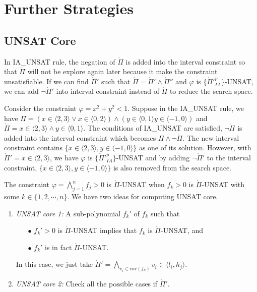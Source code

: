 \chapter{Further Strategies}
\section{UNSAT Core}
In \tiny IA\_UNSAT \normalsize rule, the negation of $\mathring\Pi$ is added into the interval constraint so that $\mathring\Pi$ will not be explore again later because it make the constraint unsatisfiable. If we can find $\mathring\Pi'$ such that $\mathring\Pi = \mathring\Pi' \wedge \mathring\Pi''$ and $\varphi$ is $\{\mathring\Pi'^p_{IA}\}$-UNSAT, we can add $\neg\mathring\Pi'$ into interval constraint instead of $\mathring\Pi$ to reduce the search space.

\begin{example}
Consider the constraint $\varphi = x^2 + y^2 < 1$. Suppose in the \tiny IA\_UNSAT \normalsize rule, we have $\Pi = (x \in \langle 2, 3 \rangle \vee x \in \langle 0, 2 \rangle) \wedge (y \in \langle 0, 1 \rangle y \in \langle -1, 0 \rangle)$ and $\mathring\Pi = x \in \langle 2, 3 \rangle \wedge y \in \langle 0, 1 \rangle$. The conditions of \tiny IA\_UNSAT \normalsize are satisfied, $\neg \mathring\Pi$ is added into the interval constraint which becomes $\Pi \wedge \neg \mathring\Pi$. The new interval constraint contains $\{x \in \langle 2, 3 \rangle, y \in \langle -1, 0 \rangle\}$ as one of its solution. However, with $\mathring\Pi' = x \in \langle 2, 3 \rangle$, we have $\varphi$ is $\{\mathring\Pi'^p_{IA}\}$-UNSAT and by adding $\neg\mathring\Pi'$ to the interval constraint, $\{x \in \langle 2, 3 \rangle, y \in \langle -1, 0 \rangle\}$ is also removed from the search space.
\end{example}

The constraint $\varphi = \bigwedge\limits_{j=1}^n f_j > 0$ is $\mathring\Pi$-UNSAT when $f_k > 0$ is $\mathring\Pi$-UNSAT with some $k \in \{1, 2, \cdots, n\}$. We have two ideas for computing UNSAT core.
\begin{enumerate}
\item \emph{UNSAT core 1:} A sub-polynomial $f_k'$ of $f_k$ such that
\begin{itemize}
\item[$\bullet$] $f_k' > 0$ is $\mathring\Pi$-UNSAT implies that $f_k$ is $\mathring\Pi$-UNSAT, and
\item[$\bullet$] $f_k'$ is in fact $\mathring\Pi$-UNSAT.
\end{itemize} 
In this case, we just take $\mathring\Pi' = \bigwedge\limits_{v_i \in var(f_k)}v_i \in \langle l_i, h_j \rangle$.
\item \emph{UNSAT core 2:} Check all the possible cases if $\mathring\Pi'$.
\end{enumerate}

